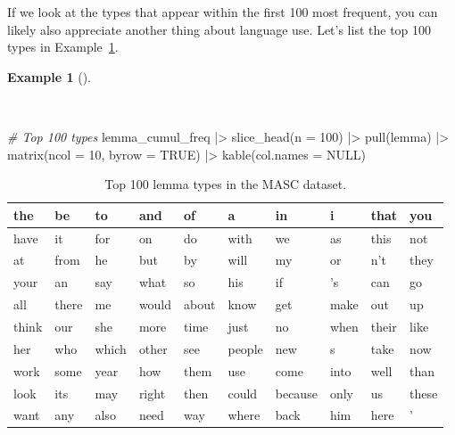 \documentclass[
  letterpaper,
  DIV=11,
  numbers=noendperiod]{scrreport}
\newenvironment{Shaded}{\begin{snugshade}}{\end{snugshade}}
\newcommand{\AttributeTok}[1]{\textcolor[rgb]{0.00,0.00,0.00}{#1}}
\newcommand{\CommentTok}[1]{\textcolor[rgb]{0.00,0.00,0.00}{\textit{#1}}}
\newcommand{\ConstantTok}[1]{\textcolor[rgb]{0.00,0.00,0.00}{#1}}
\newcommand{\DecValTok}[1]{\textcolor[rgb]{0.00,0.00,0.00}{#1}}
\newcommand{\FunctionTok}[1]{\textcolor[rgb]{0.00,0.00,0.00}{#1}}
\newcommand{\NormalTok}[1]{\textcolor[rgb]{0.00,0.00,0.00}{#1}}
\newcommand{\SpecialCharTok}[1]{\textcolor[rgb]{0.00,0.00,0.00}{#1}}
\theoremstyle{definition}
\newtheorem{example}{Example}[chapter]
\theoremstyle{remark}
\begin{document}
If we look at the types that appear within the first 100 most frequent,
you can likely also appreciate another thing about language use. Let's
list the top 100 types in Example~\ref{exm-eda-masc-count-top-100}.

\begin{example}[]\protect\hypertarget{exm-eda-masc-count-top-100}{}\label{exm-eda-masc-count-top-100}

~

\begin{Shaded}
\begin{Highlighting}[]
\CommentTok{\# Top 100 types}
\NormalTok{lemma\_cumul\_freq }\SpecialCharTok{|\textgreater{}} 
  \FunctionTok{slice\_head}\NormalTok{(}\AttributeTok{n =} \DecValTok{100}\NormalTok{) }\SpecialCharTok{|\textgreater{}} 
  \FunctionTok{pull}\NormalTok{(lemma) }\SpecialCharTok{|\textgreater{}} 
  \FunctionTok{matrix}\NormalTok{(}\AttributeTok{ncol =} \DecValTok{10}\NormalTok{, }\AttributeTok{byrow =} \ConstantTok{TRUE}\NormalTok{) }\SpecialCharTok{|\textgreater{}}
  \FunctionTok{kable}\NormalTok{(}\AttributeTok{col.names =} \ConstantTok{NULL}\NormalTok{)}
\end{Highlighting}
\end{Shaded}

\hypertarget{tbl-eda-masc-count-top-100}{}
\begin{table}
\caption{\label{tbl-eda-masc-count-top-100}Top 100 lemma types in the MASC dataset. }\tabularnewline

\centering
\begin{tabular}{l|l|l|l|l|l|l|l|l|l}
\hline
the & be & to & and & of & a & in & i & that & you\\
\hline
have & it & for & on & do & with & we & as & this & not\\
\hline
at & from & he & but & by & will & my & or & n't & they\\
\hline
your & an & say & what & so & his & if & 's & can & go\\
\hline
all & there & me & would & about & know & get & make & out & up\\
\hline
think & our & she & more & time & just & no & when & their & like\\
\hline
her & who & which & other & see & people & new & s & take & now\\
\hline
work & some & year & how & them & use & come & into & well & than\\
\hline
look & its & may & right & then & could & because & only & us & these\\
\hline
want & any & also & need & way & where & back & him & here & '\\
\hline
\end{tabular}
\end{table}

\end{example}
\end{document}
